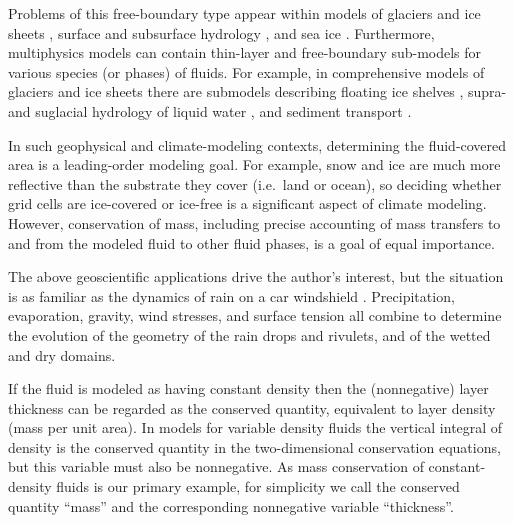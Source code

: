 \documentclass[final,onefignum]{siamart190516}
\begin{document}
Problems of this free-boundary type appear within models of glaciers and ice sheets \cite{Bueler2016,CalvoDuranyVazquez2000,Calvoetal2002,DiazSchiavi1999,EgholmNielsen2010,JouvetBueler2012},  surface and subsurface hydrology \cite{AlonsoSantillanaDawson2008,Maxwelletal2014}, and sea ice \cite{LipscombHunke2004,Thorndikeetal1975}.  Furthermore, multiphysics models can contain thin-layer and free-boundary sub-models for various species (or phases) of fluids.  For example, in comprehensive models of glaciers and ice sheets there are submodels describing floating ice shelves \cite{Albrechtetal2011}, supra- and suglacial hydrology of liquid water \cite{Aschwandenetal2012,BuelervanPelt2015,Schoofetal2012}, and sediment transport \cite{Brinkerhoffetal2017}.

In such geophysical and climate-modeling contexts, determining the fluid-covered area is a leading-order modeling goal.  For example, snow and ice are much more reflective than the substrate they cover (i.e.~land or ocean), so deciding whether grid cells are ice-covered or ice-free is a significant aspect of climate modeling.  However, conservation of mass, including precise accounting of mass transfers to and from the modeled fluid to other fluid phases, is a goal of equal importance.

The above geoscientific applications drive the author's interest, but the situation is as familiar as the dynamics of rain on a car windshield \cite{Kondic2003}.  Precipitation, evaporation, gravity, wind stresses, and surface tension all combine to determine the evolution of the geometry of the rain drops and rivulets, and of the wetted and dry domains.

If the fluid is modeled as having constant density then the (nonnegative) layer thickness can be regarded as the conserved quantity, equivalent to layer density (mass per unit area).  In models for variable density fluids the vertical integral of density is the conserved quantity in the two-dimensional conservation equations, but this variable must also be nonnegative.  As mass conservation of constant-density fluids is our primary example, for simplicity we call the conserved quantity ``mass'' and the corresponding nonnegative variable ``thickness''.
\end{document}
